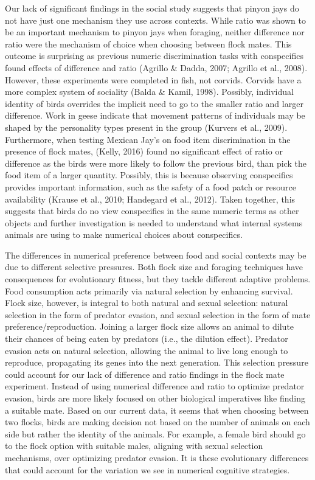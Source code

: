 \documentclass[
  ,doc,floatsintext]{apa6}
\begin{document}
Our lack of significant findings in the social study suggests that pinyon jays do not have just one mechanism they use across contexts. While ratio was shown to be an important mechanism to pinyon jays when foraging, neither difference nor ratio were the mechanism of choice when choosing between flock mates. This outcome is surprising as previous numeric discrimination tasks with conspecifics found effects of difference and ratio (Agrillo \& Dadda, 2007; Agrillo et al., 2008). However, these experiments were completed in fish, not corvids. Corvids have a more complex system of sociality (Balda \& Kamil, 1998). Possibly, individual identity of birds overrides the implicit need to go to the smaller ratio and larger difference. Work in geese indicate that movement patterns of individuals may be shaped by the personality types present in the group (Kurvers et al., 2009). Furthermore, when testing Mexican Jay's on food item discrimination in the presence of flock mates, (Kelly, 2016) found no significant effect of ratio or difference as the birds were more likely to follow the previous bird, than pick the food item of a larger quantity. Possibly, this is because observing conspecifics provides important information, such as the safety of a food patch or resource availability (Krause et al., 2010; Handegard et al., 2012). Taken together, this suggests that birds do no view conspecifics in the same numeric terms as other objects and further investigation is needed to understand what internal systems animals are using to make numerical choices about conspecifics.

The differences in numerical preference between food and social contexts may be due to different selective pressures. Both flock size and foraging techniques have consequences for evolutionary fitness, but they tackle different adaptive problems. Food consumption acts primarily via natural selection by enhancing survival. Flock size, however, is integral to both natural and sexual selection: natural selection in the form of predator evasion, and sexual selection in the form of mate preference/reproduction. Joining a larger flock size allows an animal to dilute their chances of being eaten by predators (i.e., the dilution effect). Predator evasion acts on natural selection, allowing the animal to live long enough to reproduce, propagating its genes into the next generation. This selection pressure could account for our lack of difference and ratio findings in the flock mate experiment. Instead of using numerical difference and ratio to optimize predator evasion, birds are more likely focused on other biological imperatives like finding a suitable mate. Based on our current data, it seems that when choosing between two flocks, birds are making decision not based on the number of animals on each side but rather the identity of the animals. For example, a female bird should go to the flock option with suitable males, aligning with sexual selection mechanisms, over optimizing predator evasion. It is these evolutionary differences that could account for the variation we see in numerical cognitive strategies.
\end{document}
